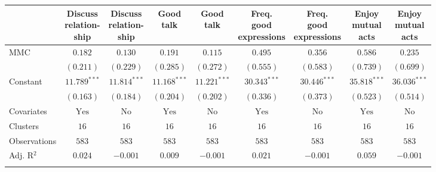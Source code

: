 
\begin{tabular}{l c c c c c c c c}
\toprule
 & \shortstack{Discuss \\ relation- \\ ship} & \shortstack{Discuss \\ relation- \\ ship} & \shortstack{Good \\ talk} & \shortstack{Good \\ talk} & \shortstack{Freq. \\ good \\ expressions} & \shortstack{Freq. \\ good \\ expressions} & \shortstack{Enjoy \\ mutual \\ acts} & \shortstack{Enjoy \\ mutual \\ acts} \\
\midrule
MMC          & $0.182$        & $0.130$        & $0.191$        & $0.115$        & $0.495$        & $0.356$        & $0.586$        & $0.235$        \\
             & $(0.211)$      & $(0.229)$      & $(0.285)$      & $(0.272)$      & $(0.555)$      & $(0.583)$      & $(0.739)$      & $(0.699)$      \\
Constant     & $11.789^{***}$ & $11.814^{***}$ & $11.168^{***}$ & $11.221^{***}$ & $30.343^{***}$ & $30.446^{***}$ & $35.818^{***}$ & $36.036^{***}$ \\
             & $(0.163)$      & $(0.184)$      & $(0.204)$      & $(0.202)$      & $(0.336)$      & $(0.373)$      & $(0.523)$      & $(0.514)$      \\
\midrule
Covariates   & $\textrm{Yes}$ & $\textrm{No}$  & $\textrm{Yes}$ & $\textrm{No}$  & $\textrm{Yes}$ & $\textrm{No}$  & $\textrm{Yes}$ & $\textrm{No}$  \\
Clusters     & $16$           & $16$           & $16$           & $16$           & $16$           & $16$           & $16$           & $16$           \\
Observations & $583$          & $583$          & $583$          & $583$          & $583$          & $583$          & $583$          & $583$          \\
Adj. R$^2$   & $0.024$        & $-0.001$       & $0.009$        & $-0.001$       & $0.021$        & $-0.001$       & $0.059$        & $-0.001$       \\
\bottomrule
\multicolumn{9}{l}{\scriptsize{\parbox{\linewidth}{\vspace{2pt}
}}}
\end{tabular}
